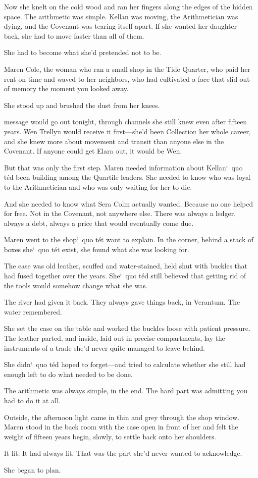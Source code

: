 \documentclass[12pt,letterpaper,openany]{book}
\begin{document}
Now she knelt on the cold wood and ran her fingers along the edges of the hidden space. The arithmetic was simple. Kellan was moving, the Arithmetician was dying, and the Covenant was tearing itself apart. If she wanted her daughter back, she had to move faster than all of them.
\par
She had to become what she'd pretended not to be.
\par
Maren Cole, the woman who ran a small shop in the Tide Quarter, who paid her rent on time and waved to her neighbors, who had cultivated a face that slid out of memory the moment you looked away.
\par
She stood up and brushed the dust from her knees.
\par
\hrulefillThe message would go out tonight, through channels she still knew even after fifteen years. Wen Trellyn would receive it first—she'd been Collection her whole career, and she knew more about movement and transit than anyone else in the Covenant. If anyone could get Elara out, it would be Wen.
\par
But that was only the first step. Maren needed information about Kellan`\ quo t\'e{}d been building among the Quartile leaders. She needed to know who was loyal to the Arithmetician and who was only waiting for her to die.
\par
And she needed to know what Sera Colm actually wanted. Because no one helped for free. Not in the Covenant, not anywhere else. There was always a ledger, always a debt, always a price that would eventually come due.
\par
Maren went to the shop`\ quo t\'e{}t want to explain. In the corner, behind a stack of boxes she`\ quo t\'e{}t exist, she found what she was looking for.
\par
The case was old leather, scuffed and water-stained, held shut with buckles that had fused together over the years. She`\ quo t\'e{}d still believed that getting rid of the tools would somehow change what she was.
\par
The river had given it back. They always gave things back, in Verantum. The water remembered.
\par
She set the case on the table and worked the buckles loose with patient pressure. The leather parted, and inside, laid out in precise compartments, lay the instruments of a trade she'd never quite managed to leave behind.
\par
She didn`\ quo t\'e{}d hoped to forget—and tried to calculate whether she still had enough left to do what needed to be done.
\par
The arithmetic was always simple, in the end. The hard part was admitting you had to do it at all.
\par
Outside, the afternoon light came in thin and grey through the shop window. Maren stood in the back room with the case open in front of her and felt the weight of fifteen years begin, slowly, to settle back onto her shoulders.
\par
It fit. It had always fit. That was the part she'd never wanted to acknowledge.
\par
She began to plan.
\par
\end{document}
